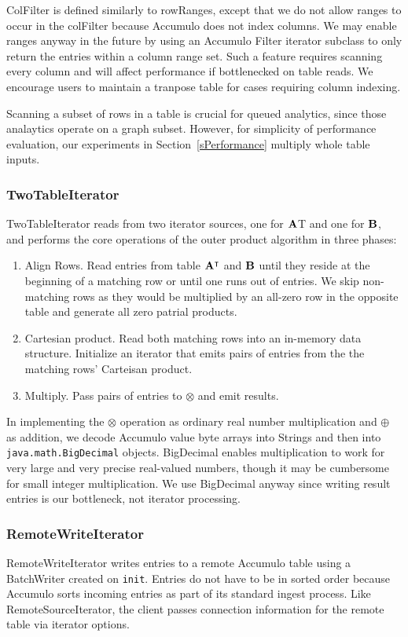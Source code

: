 ColFilter is defined similarly to rowRanges, except that we do not allow ranges to occur in the colFilter
because Accumulo does not index columns.  We may enable ranges anyway in the future by using an Accumulo
Filter iterator subclass to only return the entries within a column range set.
Such a feature requires scanning every column and will affect performance if bottlenecked on table reads.
We encourage users to maintain a tranpose table for cases requiring column indexing.

Scanning a subset of rows in a table is crucial for queued analytics, since those analaytics 
operate on a graph subset.  However, for simplicity of performance evaluation, 
our experiments in Section~\ref{sPerformance} multiply whole table inputs.

\subsubsection{TwoTableIterator}
TwoTableIterator reads from two iterator sources, one for $\mathbf{A}$T and one for $\mathbf{B}$,
and performs the core operations of the outer product algorithm in three phases:
\begin{enumerate}
\item Align Rows.  Read entries from table $\mathbf{A^{\intercal}}$ and $\mathbf{B}$ until they reside at the beginning of a matching row
or until one runs out of entries. We skip non-matching rows as they would be multiplied by an all-zero row in the
opposite table and generate all zero patrial products.
\item Cartesian product. Read both matching rows into an in-memory data structure. 
Initialize an iterator that emits pairs of entries from the the matching rows' Carteisan product.
\item Multiply. Pass pairs of entries to $\otimes$ and emit results. 
\end{enumerate}

In implementing the $\otimes$ operation as ordinary real number multiplication and $\oplus$ as addition,
we decode Accumulo value byte arrays into Strings and then into \texttt{java.math.BigDecimal}
objects. BigDecimal enables multiplication to work for very large and very precise real-valued numbers,
though it may be cumbersome for small integer multiplication. We use BigDecimal anyway since 
writing result entries is our bottleneck, not iterator processing.

\subsubsection{RemoteWriteIterator}
RemoteWriteIterator writes entries to a remote Accumulo table using a BatchWriter created on \texttt{init}.
Entries do not have to be in sorted order because Accumulo sorts incoming entries as part of its
standard ingest process. Like RemoteSourceIterator, the client passes connection information 
for the remote table via iterator options.

